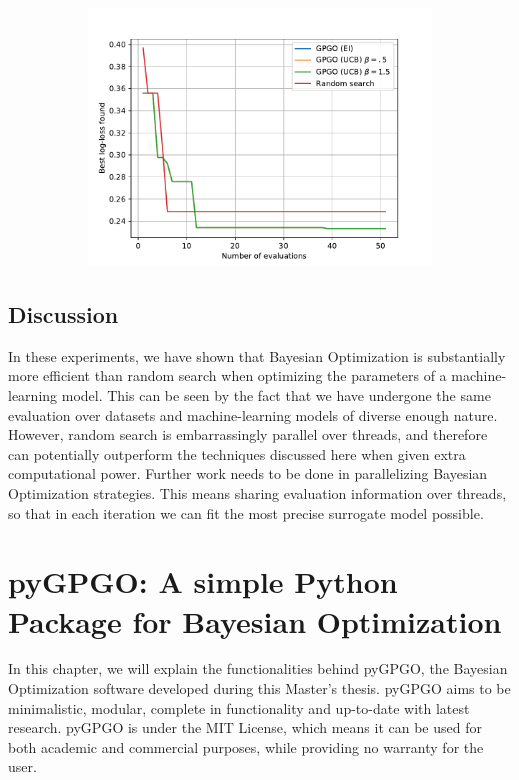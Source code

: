 \documentclass[10pt,a4paper,twoside]{book}
\begin{document}
\begin{figure}[ht]
\begin{subfigure}[t]{0.5\textwidth}
    \centering\includegraphics[width=\textwidth]{figures/chapter4/parkinson/gbm}
  \end{subfigure}
  \label{fig:parkinson}
\end{figure}


\section{Discussion}
In these experiments, we have shown that Bayesian Optimization is substantially more efficient than random search when optimizing the parameters of a machine-learning model. This can be seen by the fact that we have undergone the same evaluation over datasets and machine-learning models of diverse enough nature. However, random search is embarrassingly parallel over threads, and therefore can potentially outperform the techniques discussed here when given extra computational power. Further work needs to be done in parallelizing Bayesian Optimization strategies. This means sharing evaluation information over threads, so that in each iteration we can fit the most precise surrogate model possible.

\printbibliography

\chapter{pyGPGO: A simple Python Package for Bayesian Optimization}

In this chapter, we will explain the functionalities behind pyGPGO, the Bayesian Optimization software developed during this Master's thesis. pyGPGO aims to be minimalistic, modular, complete in functionality and up-to-date with latest research. pyGPGO is under the MIT License, which means it can be used for both academic and commercial purposes, while providing no warranty for the user.\\
\end{document}

